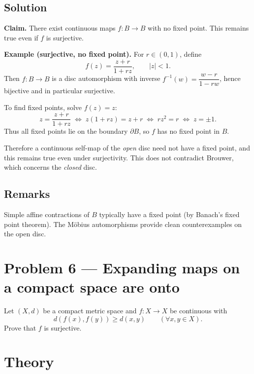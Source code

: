 \documentclass[12pt,a4paper]{article}
\theoremstyle{plain}
\theoremstyle{definition}
\theoremstyle{remark}
\theoremstyle{remark}
\begin{document}
\smallskip

\subsection*{Solution}

\noindent\textbf{Claim.} There exist continuous maps \(f:B\to B\) with no fixed point.
This remains true even if \(f\) is surjective.

\smallskip

\noindent\textbf{Example (surjective, no fixed point).}
For \(r\in(0,1)\), define
\[
f(z)=\frac{z+r}{1+rz},\qquad |z|<1 .
\]
Then \(f:B\to B\) is a disc automorphism with inverse
\(f^{-1}(w)=\dfrac{w-r}{1-rw}\), hence bijective and in particular surjective.

To find fixed points, solve \(f(z)=z\):
\[
z=\frac{z+r}{1+rz}
\;\Longleftrightarrow\;
z(1+rz)=z+r
\;\Longleftrightarrow\;
r z^2=r
\;\Longleftrightarrow\;
z=\pm 1 .
\]
Thus all fixed points lie on the boundary \(\partial B\), so \(f\) has no fixed point in \(B\).

\smallskip

Therefore a continuous self-map of the \emph{open} disc need not have a fixed point,
and this remains true even under surjectivity.  
This does not contradict Brouwer, which concerns the \emph{closed} disc.

\smallskip

\subsection*{Remarks}

Simple affine contractions of \(B\) typically have a fixed point (by Banach’s fixed point theorem).
The Möbius automorphisms provide clean counterexamples on the open disc.
	
	
\section*{Problem 6 — Expanding maps on a compact space are onto}

Let \((X,d)\) be a compact metric space and \(f:X\to X\) be continuous with
\[
d(f(x),f(y)) \ge d(x,y)\qquad (\forall x,y\in X).
\]
Prove that \(f\) is surjective.

\smallskip

\section*{Theory}
\end{document}
